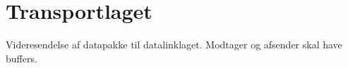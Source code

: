 \section{Transportlaget}
Videresendelse af  datapakke til datalinklaget. Modtager og afsender skal have buffers.